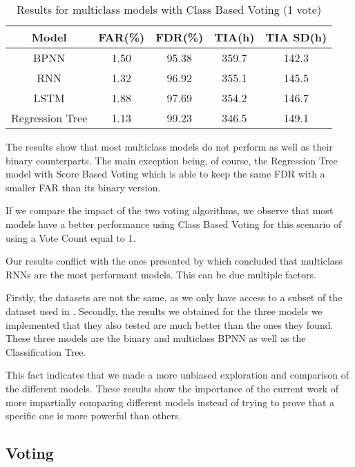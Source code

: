 \begin{table}
  \begin{center}
    \begin{tabular}{|c|c|c|c|c|}
      \hline
    Model & FAR(\%) & FDR(\%) & TIA(h) & TIA SD(h) \\
    \hline
    BPNN & 1.50 & 95.38 & 359.7 & 142.3 \\
    RNN & 1.32 & 96.92 & 355.1 & 145.5 \\
    LSTM & 1.88 & 97.69 & 354.2 & 146.7 \\
    Regression Tree & 1.13 & 99.23 & 346.5 & 149.1 \\
    \hline
    \end{tabular}
    \caption[Results Multiclass Models, Class Voting, 1 vote]{Results for multiclass models with Class Based Voting (1 vote)}
    \label{table:results_multiclass_class_one_vote}
  \end{center}
\end{table}

The results show that most multiclass models do not perform as well as their binary counterparts.
The main exception being, of course, the Regression Tree model with Score Based Voting which is able to keep the same FDR with a smaller FAR than its binary version.

If we compare the impact of the two voting algorithms, we observe that most models have a better performance using Class Based Voting for this scenario of using a Vote Count equal to 1.

Our results conflict with the ones presented by \cite{Xu16} which concluded that multiclass RNNs are the most performant models.
This can be due multiple factors.

Firstly, the datasets are not the same, as we only have access to a subset of the dataset used in \cite{Zhu13}.
Secondly, the results we obtained for the three models we implemented that they also tested are much better than the ones they found.
These three models are the binary and multiclass BPNN as well as the Classification Tree.

This fact indicates that we made a more unbiased exploration and comparison of the different models.
These results show the importance of the current work of more impartially comparing different models instead of trying to prove that a specific one is more powerful than others.

\subsection{Voting}

